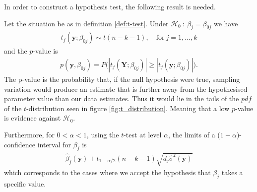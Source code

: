 In order to construct a hypothesis test, the following result is needed.

\begin{theorem}  \label{th:t_distribution}
Let the situation be as in definition \ref{def:t-test}. Under $\mathcal{H}_0 \ : \ \beta_j=\beta_{0j}$ we have 
\begin{align}
   t_j(\textbf{y};\beta_{0j})  \sim t(n-k-1), \quad \text{for} \ j=1,\ldots,k
\end{align}
and the $p$-value is
\begin{align}\label{eq:t_test_pvalue}
    p(\textbf{y},\beta_{0j})=P\Big(|t_j(\textbf{Y};\beta_{0j})|\geq |t_j(\textbf{y};\beta_{0j})|\Big).
\end{align}
The p-value is the probability that, if the null hypothesis were true, sampling variation would produce an estimate that is further away from the hypothesised parameter value than our data estimates.  
Thus it would lie in the tails of the $pdf$ of the $t$-distribution seen in figure \ref{fig:t_distribution}.
Meaning that a low $p$-value is evidence against $\mathcal{H}_0$.

Furthermore, for $0<\alpha<1$, using the $t$-test at level $\alpha$, the limits of a ($1-\alpha$)-confidence interval for $\beta_j$ is
\begin{align} \label{eq:t_statistic}
    \hat{\beta}_{j}(\textbf{y}) \pm t_{1-\alpha/2}(n-k-1)\sqrt{d_j\hat{\sigma}^2(\textbf{y})}
\end{align}
which corresponds to the cases where we accept the hypothesis that $\beta_j$ takes a specific value.
\end{theorem}
